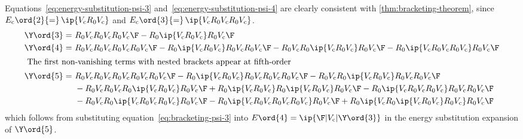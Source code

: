 \begin{ex}
Equations~\ref{eq:energy-substitution-psi-3} and~\ref{eq:energy-substitution-psi-4} are clearly consistent with \cref{thm:bracketing-theorem}, since $E_{\text{c}}\ord{2}{=}\,\ip{V_{\text{c}}R_0V_{\text{c}}}$ and $E_{\text{c}}\ord{3}{=}\,\ip{V_{\text{c}}R_0V_{\text{c}}R_0V_{\text{c}}}$.
\begin{align}
\label{eq:bracketing-psi-3}
  \Y\ord{3}
=&\
  R_0V_{\text{c}}R_0V_{\text{c}}R_0V_{\text{c}}\F
-
  R_0\ip{V_{\text{c}}R_0V_{\text{c}}}R_0V_{\text{c}}\F
\\
  \Y\ord{4}
=&\
  R_0V_{\text{c}}R_0V_{\text{c}}R_0V_{\text{c}}R_0V_{\text{c}}\F
-
  R_0\ip{V_{\text{c}}R_0V_{\text{c}}}R_0V_{\text{c}}R_0V_{\text{c}}\F
-
  R_0V_{\text{c}}R_0\ip{V_{\text{c}}R_0V_{\text{c}}}R_0V_{\text{c}}\F
-
  R_0\ip{V_{\text{c}}R_0V_{\text{c}}R_0V_{\text{c}}}R_0V_{\text{c}}\F
\\
\intertext{
The first non-vanishing terms with nested brackets appear at fifth-order
}
\nonumber
  \Y\ord{5}
=&\
  R_0V_{\text{c}}R_0V_{\text{c}}R_0V_{\text{c}}R_0V_{\text{c}}R_0V_{\text{c}}\F
-
  R_0\ip{V_{\text{c}}R_0V_{\text{c}}}R_0V_{\text{c}}R_0V_{\text{c}}R_0V_{\text{c}}\F
-
  R_0V_{\text{c}}R_0\ip{V_{\text{c}}R_0V_{\text{c}}}R_0V_{\text{c}}R_0V_{\text{c}}\F
\\&\
\nonumber
-
  R_0V_{\text{c}}R_0V_{\text{c}}R_0\ip{V_{\text{c}}R_0V_{\text{c}}}R_0V_{\text{c}}\F
+
  R_0\ip{V_{\text{c}}R_0V_{\text{c}}}R_0\ip{V_{\text{c}}R_0V_{\text{c}}}R_0V_{\text{c}}\F
-
  R_0\ip{V_{\text{c}}R_0V_{\text{c}}R_0V_{\text{c}}}R_0V_{\text{c}}R_0V_{\text{c}}\F
\\&\
-
  R_0V_{\text{c}}R_0\ip{V_{\text{c}}R_0V_{\text{c}}R_0V_{\text{c}}}R_0V_{\text{c}}\F
-
  R_0\ip{V_{\text{c}}R_0V_{\text{c}}R_0V_{\text{c}}R_0V_{\text{c}}}R_0V_{\text{c}}\F
+
  R_0\ip{V_{\text{c}}R_0\ip{V_{\text{c}}R_0V_{\text{c}}}R_0V_{\text{c}}}R_0V_{\text{c}}\F
\end{align}
which follows from substituting equation~\ref{eq:bracketing-psi-3} into $E\ord{4}=\ip{\F|V_{\text{c}}|\Y\ord{3}}$ in the energy substitution expansion of $\Y\ord{5}$.
\end{ex}


